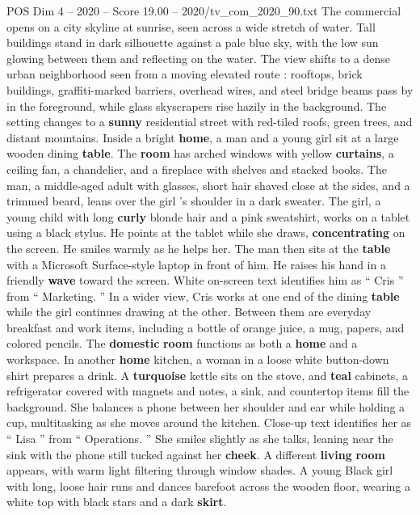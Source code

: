 \begin{textsample}{POS Dim 4 – 2020 – Score 19.00 – 2020/tv\_com\_2020\_90.txt}  \label{ex:f4_pos_006}
The commercial opens on a city skyline at sunrise, seen across a wide stretch of water.
Tall buildings stand in dark silhouette against a pale blue sky, with the low sun glowing between them and reflecting on the water.
The view shifts to a dense urban neighborhood seen from a moving elevated route : rooftops, brick buildings, graffiti-marked barriers, overhead wires, and steel bridge beams pass by in the foreground, while glass skyscrapers rise hazily in the background.
The setting changes to a \textbf{sunny} residential street with red-tiled roofs, green trees, and distant mountains.
Inside a bright \textbf{home}, a man and a young girl sit at a large wooden dining \textbf{table}.
The \textbf{room} has arched windows with yellow \textbf{curtains}, a ceiling fan, a chandelier, and a fireplace with shelves and stacked books.
The man, a middle-aged adult with glasses, short hair shaved close at the sides, and a trimmed beard, leans over the girl ’s shoulder in a dark sweater.
The girl, a young child with long \textbf{curly} blonde hair and a pink sweatshirt, works on a tablet using a black stylus.
He points at the tablet while she draws, \textbf{concentrating} on the screen.
He smiles warmly as he helps her.
The man then sits at the \textbf{table} with a Microsoft Surface-style laptop in front of him.
He raises his hand in a friendly \textbf{wave} toward the screen.
White on-screen text identifies him as “ Cris ” from “ Marketing. ” In a wider view, Cris works at one end of the dining \textbf{table} while the girl continues drawing at the other.
Between them are everyday breakfast and work items, including a bottle of orange juice, a mug, papers, and colored pencils.
The \textbf{domestic} \textbf{room} functions as both a \textbf{home} and a workspace.
In another \textbf{home} kitchen, a woman in a loose white button-down shirt prepares a drink.
A \textbf{turquoise} kettle sits on the stove, and \textbf{teal} cabinets, a refrigerator covered with magnets and notes, a sink, and countertop items fill the background.
She balances a phone between her shoulder and ear while holding a cup, multitasking as she moves around the kitchen.
Close-up text identifies her as “ Lisa ” from “ Operations. ” She smiles slightly as she talks, leaning near the sink with the phone still tucked against her \textbf{cheek}.
A different \textbf{living} \textbf{room} appears, with warm light filtering through window shades.
A young Black girl with long, loose hair runs and dances barefoot across the wooden floor, wearing a white top with black stars and a dark \textbf{skirt}.

\end{textsample}
